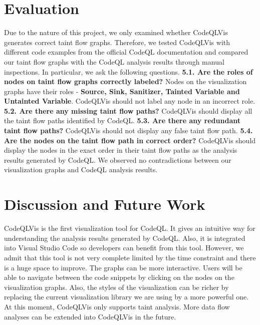\documentclass[sigplan,10pt,review]{acmart}
\begin{document}
\section{Evaluation}
Due to the nature of this project, we only examined whether CodeQLVis generates correct taint flow graphs. Therefore, we tested CodeQLVis with different code examples from the official CodeQL documentation and compared our taint flow graphs with the CodeQL analysis results through manual inspections. In particular, we ask the following questions. 
\newline
\newline
\textbf{5.1. Are the roles of nodes on taint flow graphs correctly labeled? }
\newline
Nodes on the visualization graphs have their roles - \textbf{Source, Sink, Sanitizer, Tainted Variable and Untainted Variable}. CodeQLVis should not label any node in an incorrect role. 
\newline
\newline
\textbf{5.2. Are there any missing taint flow paths? }
\newline
CodeQLVis should display all the taint flow paths identified by CodeQL.
\newline
\newline
\textbf{5.3. Are there any redundant taint flow paths? }
\newline
CodeQLVis should not display any false taint flow path.
\newline
\newline
\textbf{5.4. Are the nodes on the taint flow path in correct order? }
\newline
CodeQLVis should display the nodes in the exact order in their taint flow paths as the analysis results generated by CodeQL.
\newline
\newline
We observed no contradictions between our visualization graphs and CodeQL analysis results. 
\section{Discussion and Future Work}
CodeQLVis is the first visualization tool for CodeQL. It gives an intuitive way for understanding the analysis results generated by CodeQL. Also, it is integrated into Visual Studio Code so developers can benefit from this tool. 
\newline
\indent However, we admit that this tool is not very complete limited by the time constraint and there is a huge space to improve. 
\newline
\indent The graphs can be more interactive. Users will be able to navigate between the code snippets by clicking on the nodes on the visualization graphs. Also, the styles of the visualization can be richer by replacing the current visualization library we are using by a more powerful one. At this moment, CodeQLVis only supports taint analysis. More data flow analyses can be extended into CodeQLVis in the future. 
\end{document}
